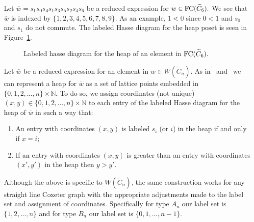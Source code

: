 \begin{example}
Let $\overline{w}=s_1s_0s_4s_1s_3s_5s_2s_4s_6$ be a reduced expression for $w \in \mathrm{FC}(\widetilde{C}_6).$ We see that $\overline{w}$ is indexed by $\{1,2,3,4,5,6,7,8,9\}$. As an example, $1 \lessdot 0$ since $0 <1$ and $s_0$ and $s_1$ do not commute. The labeled Hasse diagram for the heap poset is seen in Figure~\ref{fig:Hasse}.
\begin{figure}[h]
\centering
{}
\caption{Labeled hasse diagram for the heap of an element in $\mathrm{FC}(\widetilde{C}_6).$}
\label{fig:Hasse}	
\end{figure}
\end{example}

Let $\overline{w}$ be a reduced expression for an element in $w \in W(\widetilde{C}_n)$. As in~\cite{Billey2007} and~\cite{Ernst2010} we can represent a heap for $\overline{w}$ as a set of lattice points embedded in $\{0,1,2,\ldots, n\} \times \mathbb{N}$. To do so, we assign coordinates (not unique) $(x,y) \in \{0,1,2,\ldots, n\} \times \mathbb{N}$ to each entry of the labeled Hasse diagram for the heap of $\overline{w}$ in such a way that:
\begin{enumerate}
\item An entry with coordinates $(x,y)$ is labeled $s_i$ (or $i$) in the heap if and only if $x = i$; 

\item If an entry with coordinates $(x,y)$ is greater than an entry with coordinates $(x',y')$ in the heap then $y > y'$.
\end{enumerate}

Although the above is specific to $W(\widetilde{C}_n)$, the same construction works for any straight line Coxeter graph with the appropriate adjustments made to the label set and assignment of coordinates. Specifically for type $A_n$ our label set is $\{1,2, \ldots, n\}$ and for type $B_n$ our label set is $\{0,1, \ldots, n-1\}$.

